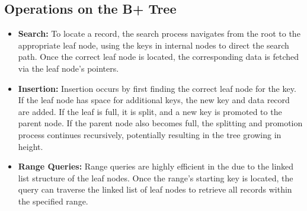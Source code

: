 \subsection{Operations on the B+ Tree}

\begin{itemize}
    \item \textbf{Search:} To locate a record, the search process navigates from the root to the appropriate leaf node, using the keys in internal nodes to direct the search path. Once the correct leaf node is located, the corresponding data is fetched via the leaf node’s pointers.
    \item \textbf{Insertion:} Insertion occurs by first finding the correct leaf node for the key. If the leaf node has space for additional keys, the new key and data record are added. If the leaf is full, it is split, and a new key is promoted to the parent node. If the parent node also becomes full, the splitting and promotion process continues recursively, potentially resulting in the tree growing in height.
    \item \textbf{Range Queries:} Range queries are highly efficient in the \bplustree due to the linked list structure of the leaf nodes. Once the range's starting key is located, the query can traverse the linked list of leaf nodes to retrieve all records within the specified range.
\end{itemize}

